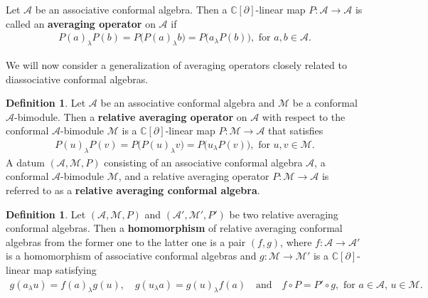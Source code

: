 \documentclass[a4paper,reqno,10pt]{amsart}
\theoremstyle{plain}
\theoremstyle{definition}
\newtheorem{definition}[thm]{Definition}
\theoremstyle{remark}
\newcommand{\M}{\mathcal{M}}
\newcommand{\la}{\lambda}
\begin{document}
\medskip

Let $\mathcal{A}$ be an associative conformal algebra. Then a $\mathbb{C}[\partial]$-linear map $P:\mathcal{A} \rightarrow \mathcal{A}$ is called an {\bf averaging operator} on $\mathcal{A}$ if
\begin{align*}
P(a)_{\la}P(b)
=
P\bigl(P(a)_{\la}b\bigr)
=
P\bigl(a_{\la}P(b)\bigr),
\text{ for }a,b\in\mathcal{A}.
\end{align*}



We will now consider a generalization of averaging operators closely related to diassociative conformal algebras.

\begin{definition}
Let $\mathcal{A}$ be an associative conformal algebra and $\mathcal{M}$ be a conformal $\mathcal{A}$-bimodule. Then a {\bf relative averaging operator} on $\mathcal{A}$ with respect to the conformal $\mathcal{A}$-bimodule $\mathcal{M}$ is a $\mathbb{C}[\partial]$-linear map $P:\mathcal{M}\rightarrow\mathcal{A}$ that satisfies
\begin{align*}
P(u)_{\la}P(v)
=
P\bigl(P(u)_{\la} v\bigr)
=
P\bigl(u_{\la}P(v)\bigr), \text{ for } u, v \in\mathcal{M}.
\end{align*}
A datum $(\mathcal{A},\mathcal{M}, P)$ consisting of an associative conformal algebra $\mathcal{A}$, a conformal $\mathcal{A}$-bimodule $\M$, and a relative averaging operator $P: \M \rightarrow \mathcal{A}$ is referred to as a \textbf{relative averaging conformal algebra}.
\end{definition}

\begin{definition}\label{dmor}
Let $(\mathcal{A},\mathcal{M},P)$ and
$(\mathcal{A}',\mathcal{M}',P')$ be two relative averaging conformal algebras. Then a {\bf homomorphism} of relative averaging conformal algebras
from the former one to the latter one is a pair $(f,g)$, where
$f:\mathcal{A}\to\mathcal{A}'$ is a homomorphism of associative conformal algebras and
$g:\mathcal{M}\to\mathcal{M}'$ is a $\mathbb{C}[\partial]$-linear map satisfying
\begin{align*}
g(a_{\la}u)=f(a)_{\la}g(u), \quad 
g(u_{\la}a)=g(u)_{\la}f(a) ~~~ \text{ and }
~~~ f\circ P=P'\circ g, \text{ for } a\in\mathcal{A},\,u\in\mathcal{M}.
\end{align*}
\end{definition}
\end{document}

